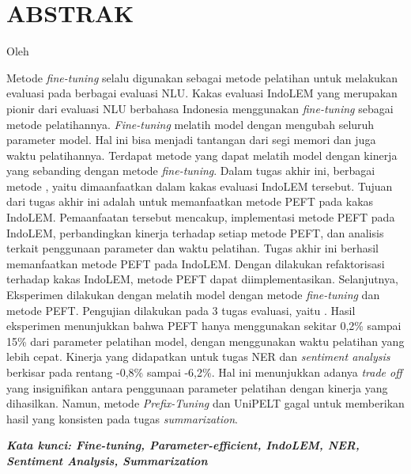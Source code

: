 \clearpage
\chapter*{ABSTRAK}

\begin{center}
    \center
    \begin{singlespace}
        \large\bfseries\MakeUppercase{\thetitle}
    
        \normalfont\normalsize
        Oleh
    
        \bfseries \theauthor
    \end{singlespace}
\end{center} 

\begin{singlespace}
    Metode \textit{fine-tuning} selalu digunakan sebagai metode pelatihan untuk melakukan evaluasi pada berbagai evaluasi NLU. Kakas evaluasi IndoLEM yang merupakan pionir dari evaluasi NLU berbahasa Indonesia menggunakan \textit{fine-tuning} sebagai metode pelatihannya. \textit{Fine-tuning} melatih model dengan mengubah seluruh parameter model. Hal ini bisa menjadi tantangan dari segi memori dan juga waktu pelatihannya. Terdapat metode \PEFT yang dapat melatih model dengan kinerja yang sebanding dengan metode \textit{fine-tuning}. Dalam tugas akhir ini, berbagai metode \PEFT, yaitu \methodPEFT dimaanfaatkan dalam kakas evaluasi IndoLEM tersebut. Tujuan dari tugas akhir ini adalah untuk memanfaatkan metode PEFT pada kakas IndoLEM. Pemaanfaatan tersebut mencakup, implementasi metode PEFT pada IndoLEM, perbandingkan kinerja terhadap setiap metode PEFT, dan analisis terkait penggunaan parameter dan waktu pelatihan.
    Tugas akhir ini berhasil memanfaatkan metode PEFT pada IndoLEM. Dengan dilakukan refaktorisasi terhadap kakas IndoLEM, metode PEFT dapat diimplementasikan. Selanjutnya, Eksperimen dilakukan dengan melatih model dengan metode \textit{fine-tuning} dan metode PEFT. Pengujian dilakukan pada 3 tugas evaluasi, yaitu \nlptask. Hasil eksperimen menunjukkan bahwa PEFT hanya menggunakan sekitar 0,2\% sampai 15\% dari parameter pelatihan model, dengan menggunakan waktu pelatihan yang lebih cepat. Kinerja yang didapatkan untuk tugas NER dan \textit{sentiment analysis} berkisar pada rentang -0,8\% sampai -6,2\%. Hal ini menunjukkan adanya \textit{trade off} yang insignifikan antara penggunaan parameter pelatihan dengan kinerja yang dihasilkan. Namun, metode \textit{Prefix-Tuning} dan UniPELT gagal untuk memberikan hasil yang konsisten pada tugas \textit{summarization}.

    \textit{\textbf{Kata kunci: Fine-tuning, Parameter-efficient, IndoLEM, NER, Sentiment Analysis, Summarization}}
\end{singlespace}

\clearpage
